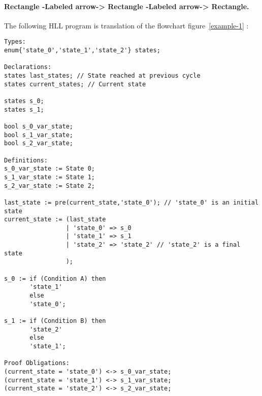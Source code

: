 \paragraph{Rectangle -Labeled arrow-> Rectangle -Labeled arrow-> Rectangle.}
The following HLL program is translation of the flowchart
figure~\ref{example-1} : 
{\footnotesize
\begin{verbatim}
Types:
enum{'state_0','state_1','state_2'} states;

Declarations:
states last_states; // State reached at previous cycle
states current_states; // Current state

states s_0;
states s_1;

bool s_0_var_state;
bool s_1_var_state;
bool s_2_var_state;

Definitions:
s_0_var_state := State 0;
s_1_var_state := State 1;
s_2_var_state := State 2;

last_state := pre(current_state,'state_0'); // 'state_0' is an initial state
current_state := (last_state
                 | 'state_0' => s_0
                 | 'state_1' => s_1
                 | 'state_2' => 'state_2' // 'state_2' is a final state
                 );

s_0 := if (Condition A) then
       'state_1'
       else
       'state_0';

s_1 := if (Condition B) then
       'state_2'
       else
       'state_1';

Proof Obligations:
(current_state = 'state_0') <-> s_0_var_state;
(current_state = 'state_1') <-> s_1_var_state;
(current_state = 'state_2') <-> s_2_var_state;
\end{verbatim}
}


